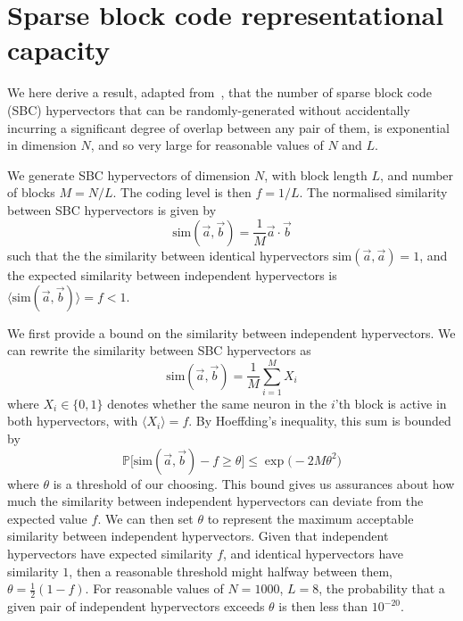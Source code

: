 \FloatBarrier

\section{Sparse block code representational capacity}
\label{sec:sbc_capacity}

We here derive a result, adapted from~\cite{thomas_theoretical_2022}, that the number of sparse block code (SBC) hypervectors that can be randomly-generated without accidentally incurring a significant degree of overlap between any pair of them, is exponential in dimension $N$, and so very large for reasonable values of $N$ and $L$.


We generate SBC hypervectors of dimension $N$, with block length $L$, and number of blocks $M = N/L$. The coding level is then $f = 1/L$. The normalised similarity between SBC hypervectors is given by
\begin{equation}
    \mathrm{sim}(\vec{a}, \vec{b}) = \frac{1}{M} \vec{a} \cdot \vec{b}
\end{equation}
such that the the similarity between identical hypervectors $\mathrm{sim}(\vec{a}, \vec{a}) = 1$, and the expected similarity between independent hypervectors is $\langle \mathrm{sim}(\vec{a}, \vec{b}) \rangle = f < 1$.



We first provide a bound on the similarity between independent hypervectors. We can rewrite the similarity between SBC hypervectors as
\begin{equation}
    \mathrm{sim}(\vec{a}, \vec{b}) = \frac{1}{M} \sum_{i=1}^{M} X_i
\end{equation}
where $X_i \in \{0,1\}$ denotes whether the same neuron in the $i$'th block is active in both hypervectors, with $\langle X_i \rangle = f$. By Hoeffding's inequality, this sum is bounded by
\begin{equation}
    \mathbb{P}\big[ \mathrm{sim}(\vec{a}, \vec{b}) - f \geq \theta \big] \leq  \exp \big( -2 M \theta^2 \big)
\end{equation}
where $\theta$ is a threshold of our choosing. This bound gives us assurances about how much the similarity between independent hypervectors can deviate from the expected value $f$. We can then set $\theta$ to represent the maximum acceptable similarity between independent hypervectors. Given that independent hypervectors have expected similarity $f$, and identical hypervectors have similarity $1$, then a reasonable threshold might halfway between them, $\theta = \frac{1}{2}(1-f)$. For reasonable values of $N = 1000$, $L = 8$, the probability that a given pair of independent hypervectors exceeds $\theta$ is then less than $10^{-20}$.

